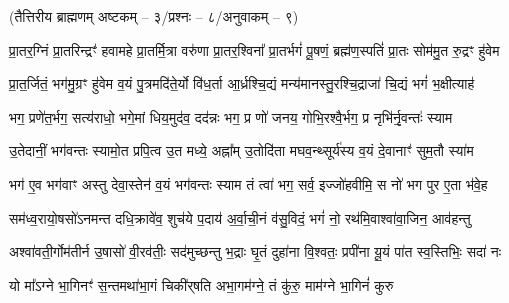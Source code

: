 

\vspace{-1ex}
\centerline{\normalsize(तैत्तिरीय ब्राह्मणम् अष्टकम् – ३/प्रश्नः – ८/अनुवाकम् – ९)}


\twolineshloka
{प्रा॒तर॒ग्निं प्रा॒तरिन्द्रꣳ॑ हवामहे प्रा॒तर्मि॒त्रा वरु॑णा प्रा॒तर॒श्विना᳚}
{प्रा॒तर्भगं॑ पू॒षणं॒ ब्रह्म॑ण॒स्पतिं॑ प्रा॒तः सोम॑मु॒त रु॒द्रꣳ हु॑वेम}

\twolineshloka
{प्रा॒त॒र्जितं॒ भग॑मु॒ग्रꣳ हु॑वेम व॒यं पु॒त्रमदि॑ते॒र्यो वि॑ध॒र्ता}
{आ॒र्ध्रश्चि॒द्यं मन्य॑मानस्तु॒रश्चि॒द्राजा॑ चि॒द्यं भगं॑ भ॒क्षीत्याह॑}

\twolineshloka
{भग॒ प्रणे॑त॒र्भग॒ सत्य॑राधो॒ भगे॒मां धिय॒मुद॑व॒ दद॑न्नः}
{भग॒ प्र णो॑ जनय॒ गोभि॒रश्वै॒र्भग॒ प्र नृभि॑र्नृ॒वन्तः॑ स्याम}

\twolineshloka
{उ॒तेदानीं॒ भग॑वन्तः स्यामो॒त प्रपि॒त्व उ॒त मध्ये॒ अह्ना᳚म्}
{उ॒तोदि॑ता मघव॒न्थ्सूर्य॑स्य व॒यं दे॒वानाꣳ॑ सुम॒तौ स्या॑म}

\twolineshloka
{भग॑ ए॒व भग॑वाꣳ अस्तु देवा॒स्तेन॑ व॒यं भग॑वन्तः स्याम}
{तं त्वा॑ भग॒ सर्व॒ इज्जो॑हवीमि॒ स नो॑ भग पुर ए॒ता भ॑वे॒ह}

\twolineshloka
{सम॑ध्व॒रायो॒षसो॑ऽनमन्त दधि॒क्रावे॑व॒ शुच॑ये प॒दाय॑}
{अ॒र्वा॒ची॒नं व॑सु॒विदं॒ भगं॑ नो॒ रथ॑मि॒वाश्वा॑वा॒जिन॒ आव॑हन्तु}

\twolineshloka
{अश्वा॑वती॒र्गोम॑तीर्न उ॒षासो॑ वी॒रव॑तीः॒ सद॑मुच्छन्तु भ॒द्राः}
{घृ॒तं दुहा॑ना वि॒श्वतः॒ प्रपी॑ना यू॒यं पा॑त स्व॒स्तिभिः॒ सदा॑ नः}

\twolineshloka
{यो मा᳚ऽग्ने भा॒गिनꣳ॑ स॒न्तमथा॑भा॒गं चिकी॑र्‌षति}
{अभा॒गम॑ग्ने॒ तं कु॑रु॒ माम॑ग्ने भा॒गिनं॑ कुरु}

